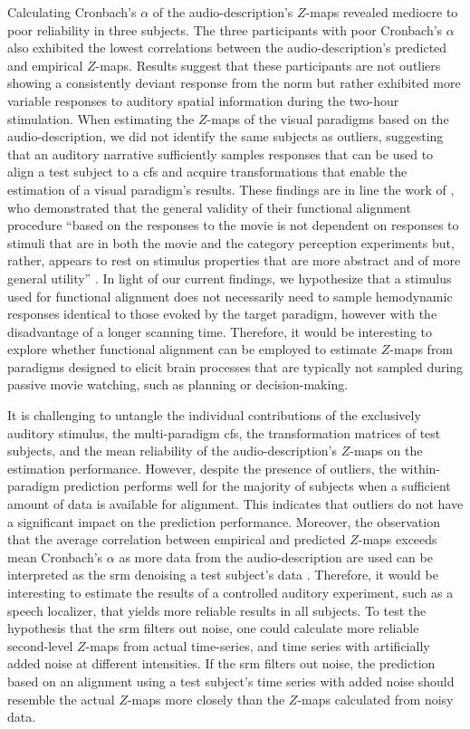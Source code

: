 %
Calculating Cronbach's $\alpha$ of the audio-description's $Z$-maps revealed
mediocre to poor reliability in three subjects.
%
The three participants with poor Cronbach's $\alpha$ also exhibited the lowest
correlations between the audio-description's predicted and empirical $Z$-maps.
%
Results suggest that these participants are not outliers showing a consistently
deviant response from the norm but rather exhibited more variable responses to
auditory spatial information during the two-hour stimulation.
%
When estimating the $Z$-maps of the visual paradigms based on the
audio-description, we did not identify the same subjects as outliers, suggesting
that an auditory narrative sufficiently samples responses that can be used to
align a test subject to a \ac{cfs} and acquire transformations that enable the
estimation of a visual paradigm's results.
%
These findings are in line the work of \citet{haxby2011common}, who demonstrated
that the general validity of their functional alignment procedure ``based on the
responses to the movie is not dependent on responses to stimuli that are in both
the movie and the category perception experiments but, rather, appears to rest
on stimulus properties that are more abstract and of more general utility''
\citep[][p. 409]{haxby2011common}.
%
In light of our current findings, we hypothesize that a stimulus used for
functional alignment does not necessarily need to sample hemodynamic responses
identical to those evoked by the target paradigm, however with the disadvantage
of a longer scanning time.
%
Therefore, it would be interesting to explore whether functional alignment can
be employed to estimate $Z$-maps from paradigms designed to elicit brain
processes that are typically not sampled during passive movie watching, such as
planning or decision-making.

%
It is challenging to untangle the individual contributions of the exclusively
auditory stimulus, the multi-paradigm \ac{cfs}, the transformation matrices of
test subjects, and the mean reliability of the audio-description's $Z$-maps on
the estimation performance.
%
However, despite the presence of outliers, the within-paradigm prediction
performs well for the majority of subjects when a sufficient amount of data is
available for alignment.
%
This indicates that outliers do not have a significant impact on the prediction
performance.
%
Moreover, the observation that the average correlation between empirical and
predicted $Z$-maps exceeds mean Cronbach's $\alpha$ as more data from the
audio-description are used can be interpreted as the \ac{srm} denoising a test
subject's data \citep[cf.][]{chen2015reduced}.
%
Therefore, it would be interesting to estimate the results of a controlled
auditory experiment, such as a speech localizer, that yields more reliable
results in all subjects.
%
To test the hypothesis that the \ac{srm} filters out noise, one could calculate
more reliable second-level $Z$-maps from actual time-series, and time series
with artificially added noise at different intensities.
%
If the \ac{srm} filters out noise, the prediction based on an alignment using a
test subject's time series with added noise should resemble the actual $Z$-maps
more closely than the $Z$-maps calculated from noisy data.


